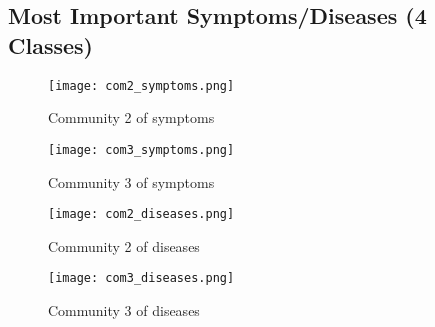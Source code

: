 \subsection{Most Important Symptoms/Diseases (4 Classes)}






\begin{figure}[H]
    \centering
    \texttt{[image: com2\_symptoms.png]}
    \caption{Community 2 of symptoms}
    \label{fig:com2_symptoms}
\end{figure}

\begin{figure}[H]
    \centering
    \texttt{[image: com3\_symptoms.png]}
    \caption{Community 3 of symptoms}
    \label{fig:com3_symptoms}
\end{figure}



\begin{figure}[H]
    \centering
    \texttt{[image: com2\_diseases.png]}
    \caption{Community 2 of diseases}
    \label{fig:com2_diseases}
\end{figure}

\begin{figure}[H]
    \centering
    \texttt{[image: com3\_diseases.png]}
    \caption{Community 3 of diseases}
    \label{fig:com3_diseases}
\end{figure}